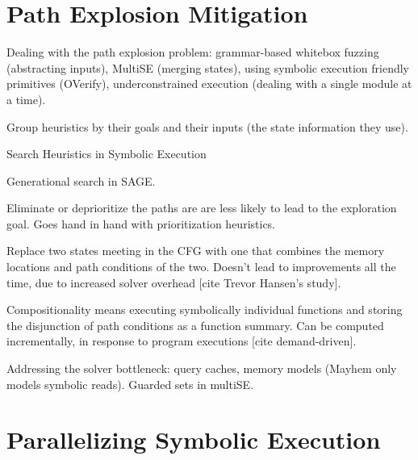 
\iffalse
\section{Path Explosion Mitigation}
\label{sec:relwork:pathexpl}

Dealing with the path explosion problem: grammar-based whitebox fuzzing (abstracting inputs), MultiSE (merging states), using symbolic execution friendly primitives (OVerify), underconstrained execution (dealing with a single module at a time).

Group heuristics by their goals and their inputs (the state information they use).

Search Heuristics in Symbolic Execution

Generational search in SAGE.

Eliminate or deprioritize the paths are are less likely to lead to the exploration goal.  Goes hand in hand with prioritization heuristics.

Replace two states meeting in the CFG with one that combines the memory locations and path conditions of the two.  Doesn't lead to improvements all the time, due to increased solver overhead [cite Trevor Hansen's study].

Compositionality means executing symbolically individual functions and storing the disjunction of path conditions as a function summary.  Can be computed incrementally, in response to program executions [cite demand-driven].

Addressing the solver bottleneck: query caches, memory models (Mayhem only models symbolic reads). Guarded sets in multiSE.

\section{Parallelizing Symbolic Execution}
\label{sec:relwork:parsymbex}

